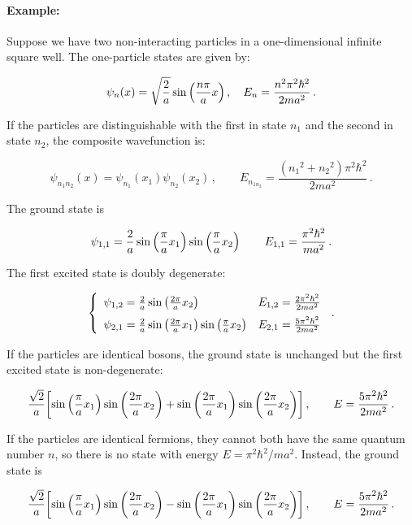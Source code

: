\documentclass[12pt, titlepage]{article}
\begin{document}
\begin{mdframed}[backgroundcolor=gray!20]
	\paragraph*{Example:}
	Suppose we have two non-interacting particles in a one-dimensional infinite square well. The one-particle states are given by:
	
	\begin{equation*}
	\psi_n(x) = \sqrt{\frac{2}{a}}\sin\qty(\frac{n\pi}{a}x) \,, \quad E_n = \frac{n^2\pi^2\hbar^2}{2ma^2} \,.
	\end{equation*}
	
	If the particles are distinguishable with the first in state $n_1$ and the second in state $n_2$, the composite wavefunction is:
	
	\begin{equation*}
	\psi_{n_{1}n_{2}}(x) = \psi_{n_{1}}(x_1)\psi_{n_{2}}(x_2) \,, \qquad E_{n_{1n_{2}}} = \frac{({n_1}^2 + {n_2}^2)\pi^2\hbar^2}{2ma^2} \,.
	\end{equation*}
	
	The ground state is 
	
	\begin{equation*}
	\psi_{1,1} = \frac{2}{a}\sin\qty(\frac{\pi}{a}x_1)\sin\qty(\frac{\pi}{a}x_2) \, \qquad E_{1,1} = \frac{\pi^2\hbar^2}{ma^2} \,.
	\end{equation*}
	
	The first excited state is doubly degenerate:
	
	\begin{equation*}
	\left\{
	\begin{array}{ll}
	\psi_{1,2} = \frac{2}{a}\sin\qty(\frac{2\pi}{a}x_2) & E_{1,2} = \frac{2\pi^2\hbar^2}{2ma^2} \\[6pt]
	\psi_{2,1} = \frac{2}{a}\sin\qty(\frac{2\pi}{a}x_1)\sin\qty(\frac{\pi}{a}x_2) & E_{2,1} = \frac{5\pi^2\hbar^2}{2ma^2}
	\end{array}
	\right. \,.
	\end{equation*}
	
	If the particles are identical bosons, the ground state is unchanged but the first excited state is non-degenerate:
	
	\begin{equation*}
	\frac{\sqrt{2}}{a}\qty[\sin\qty(\frac{\pi}{a}x_1)\sin\qty(\frac{2\pi}{a}x_2) + \sin\qty(\frac{2\pi}{a}x_1)\sin\qty(\frac{2\pi}{a}x_2)] \,,\qquad E = \frac{5\pi^2\hbar^2}{2ma^2} \,.
	\end{equation*}
	
	If the particles are identical fermions, they cannot both have the same quantum number $n$, so there is no state with energy $E = \pi^2\hbar^2/ma^2$. Instead, the ground state is
	
	\begin{equation*}
	\frac{\sqrt{2}}{a}\qty[\sin\qty(\frac{\pi}{a}x_1)\sin\qty(\frac{2\pi}{a}x_2) - \sin\qty(\frac{2\pi}{a}x_1)\sin\qty(\frac{2\pi}{a}x_2)] \,,\qquad E = \frac{5\pi^2\hbar^2}{2ma^2} \,.
	\end{equation*}
	
\end{mdframed}
\end{document}
